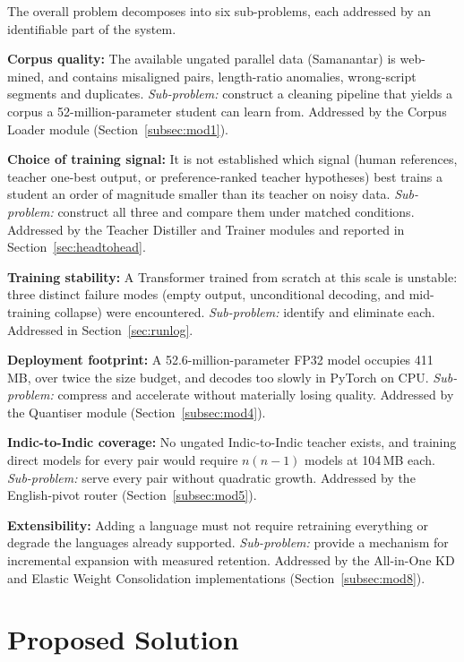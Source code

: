 The overall problem decomposes into six sub-problems, each addressed by an
identifiable part of the system.

\begin{bullets}
\item \textbf{Corpus quality:} The available ungated parallel data (Samanantar) is web-mined, and contains misaligned pairs, length-ratio anomalies, wrong-script segments and duplicates. \emph{Sub-problem:} construct a cleaning pipeline that yields a corpus a 52-million-parameter student can learn from. Addressed by the Corpus Loader module (Section~\ref{subsec:mod1}).
\item \textbf{Choice of training signal:} It is not established which signal (human references, teacher one-best output, or preference-ranked teacher hypotheses) best trains a student an order of magnitude smaller than its teacher on noisy data. \emph{Sub-problem:} construct all three and compare them under matched conditions. Addressed by the Teacher Distiller and Trainer modules and reported in Section~\ref{sec:headtohead}.
\item \textbf{Training stability:} A Transformer trained from scratch at this scale is unstable: three distinct failure modes (empty output, unconditional decoding, and mid-training collapse) were encountered. \emph{Sub-problem:} identify and eliminate each. Addressed in Section~\ref{sec:runlog}.
\item \textbf{Deployment footprint:} A 52.6-million-parameter FP32 model occupies 411\,MB, over twice the size budget, and decodes too slowly in PyTorch on CPU. \emph{Sub-problem:} compress and accelerate without materially losing quality. Addressed by the Quantiser module (Section~\ref{subsec:mod4}).
\item \textbf{Indic-to-Indic coverage:} No ungated Indic-to-Indic teacher exists, and training direct models for every pair would require $n(n-1)$ models at 104\,MB each. \emph{Sub-problem:} serve every pair without quadratic growth. Addressed by the English-pivot router (Section~\ref{subsec:mod5}).
\item \textbf{Extensibility:} Adding a language must not require retraining everything or degrade the languages already supported. \emph{Sub-problem:} provide a mechanism for incremental expansion with measured retention. Addressed by the All-in-One KD and Elastic Weight Consolidation implementations (Section~\ref{subsec:mod8}).
\end{bullets}

\section{Proposed Solution}
\label{sec:proposedsolution}

